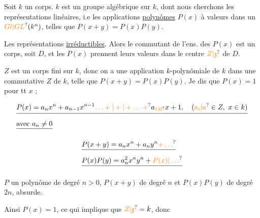 

Soit $k$ un corps. $k$ est un groupe algébrique sur $k$, dont nous cherchons les représentations linéaires, i.e les applications \uline{polynômes} $P(x)$ à valeurs dans un $\unsure{Gl|GL}(k^n)$, telles que $P(x+y)=P(x)P(y)$.

Les représentations \uline{irréductibles}. Alors le commutant  de l'ens. des $P(x)$ est un corps,  soit $D$, et les $P(x)$ prennent leurs valeurs dans le centre $\unsure{Z|\mathfrak z}$ de $D$. 

$Z$ est un corps  fini sur $k$, donc on a une application $k$-polynômiale de $k$ dans une  commutative $Z$ de $k$, telle que $P(x+y)=P(x)P(y)$.  Je dis que $P(x)=1$ pour tt $x$ ;


 

\[\begin{aligned} &\deleted{P(x)=a_n x^n+a_{n-1}x^{n-1}\unsure{\ldots+|+|+\ldots+}a_{\unsure{1|0}}x+1,\quad(\unsure{a_i|a}\in Z,\ x\in k)}\\ &\deleted{\text{avec }a_n\ne 0} \end{aligned}\]

\[\begin{aligned}&\deleted{P(x+y)=a_n x^n+a_n y^n\unsure{+\ldots}}\\ &\deleted{P(x)P(y)=a_n^2 x^n y^n+\unsure{P(x)|\ldots}}\end{aligned}\]

$P$  un polynôme de degré $n>0$, $P(x+y)$  de degré $n$ et $P(x)P(y)$ de degré $2n$, absurde.



Ainsi $P(x)=1$, ce qui implique que $\unsure{Z|\mathfrak z}=k$, donc


